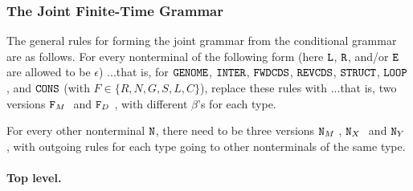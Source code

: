 \subsubsection{The Joint Finite-Time Grammar}

The general rules for forming the joint grammar from the conditional grammar are as follows.
For every nonterminal of the following form (here $\mbox{\tt L}$, $\mbox{\tt R}$, and/or $\mbox{\tt E}$ are allowed to be $\epsilon$)
...that is, for $\mbox{\tt GENOME}$, $\mbox{\tt INTER}$, $\mbox{\tt FWDCDS}$, $\mbox{\tt REVCDS}$, $\mbox{\tt STRUCT}$, $\mbox{\tt LOOP}$, and $\mbox{\tt CONS}$
(with $F \in \{ R, N, G, S, L, C \}$),
replace these rules with
...that is, two versions $\mbox{\tt F}_M\ $ and $\mbox{\tt F}_D\ $, with different $\beta$'s for each type.

For every other nonterminal $\mbox{\tt N}$, there need to be three versions $\mbox{\tt N}_M\ $, $\mbox{\tt N}_X\ $ and $\mbox{\tt N}_Y\ $,
with outgoing rules for each type going to other nonterminals of the same type.

\paragraph{Top level.}

